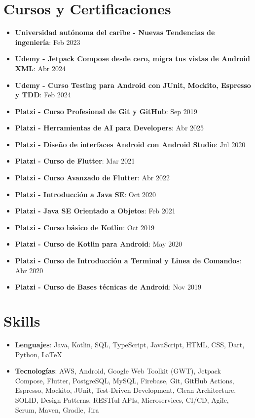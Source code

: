 \documentclass[letterpaper,11pt]{article}
\newcommand{\resumeItem}[2]{
  \item\small{
    \textbf{#1}{: #2 \vspace{-2pt}}
  }
}
\newcommand{\resumeSubItem}[2]{\resumeItem{#1}{#2}\vspace{-4pt}}
\newcommand{\resumeSubHeadingListStart}{\begin{itemize}[leftmargin=*]}
\newcommand{\resumeSubHeadingListEnd}{\end{itemize}}
\begin{document}
\section{Cursos y Certificaciones}
\resumeSubHeadingListStart
\resumeSubItem{Universidad autónoma del caribe - Nuevas Tendencias de ingeniería}{Feb 2023}
\resumeSubItem{Udemy - Jetpack Compose desde cero, migra tus vistas de Android XML}{Abr 2024}
\resumeSubItem{Udemy - Curso Testing para Android con JUnit, Mockito, Espresso y TDD}{Feb 2024}
\resumeSubItem{Platzi - Curso Profesional de Git y GitHub}{Sep 2019}
\resumeSubItem{Platzi - Herramientas de AI para Developers}{Abr 2025}
\resumeSubItem{Platzi - Diseño de interfaces Android con Android Studio}{Jul 2020}
\resumeSubItem{Platzi - Curso de Flutter}{Mar 2021}
\resumeSubItem{Platzi - Curso Avanzado de Flutter}{Abr 2022}
\resumeSubItem{Platzi - Introducción a Java SE}{Oct 2020}
\resumeSubItem{Platzi - Java SE Orientado a Objetos}{Feb 2021}
\resumeSubItem{Platzi - Curso básico de Kotlin}{Oct 2019}
\resumeSubItem{Platzi - Curso de Kotlin para Android}{May 2020}
\resumeSubItem{Platzi - Curso de Introducción a Terminal y Linea de Comandos}{Abr 2020}
\resumeSubItem{Platzi - Curso de Bases técnicas de Android}{Nov 2019}
\resumeSubHeadingListEnd

\section{Skills}
\resumeSubHeadingListStart
\item{
            \textbf{Lenguajes}{: Java, Kotlin, SQL, TypeScript, JavaScript, HTML, CSS, Dart, Python, LaTeX}
            
      }
\item {
            \textbf{Tecnologías}{: AWS, Android, Google Web Toolkit (GWT), Jetpack Compose, Flutter, PostgreSQL, MySQL, Firebase, Git, GitHub Actions, Espresso, Mockito, JUnit, Test-Driven Development, Clean Architecture, SOLID, Design Patterns, RESTful APIs, Microservices, CI/CD, Agile, Scrum, Maven, Gradle, Jira}
      }
\resumeSubHeadingListEnd


\end{document}
